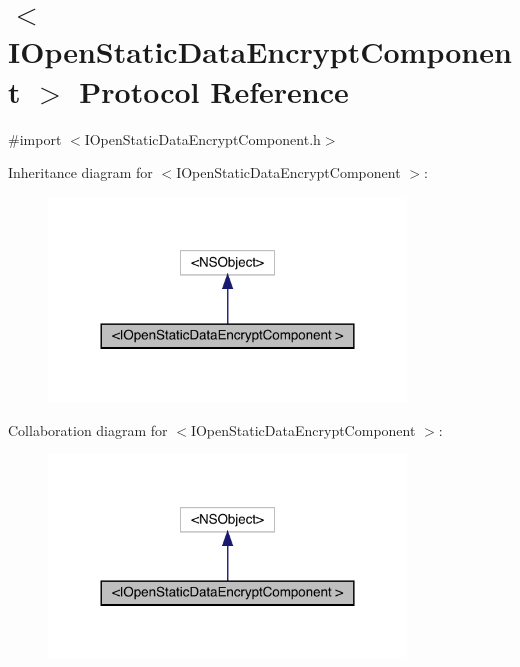 \hypertarget{protocol_i_open_static_data_encrypt_component_01-p}{}\section{$<$I\+Open\+Static\+Data\+Encrypt\+Component $>$ Protocol Reference}
\label{protocol_i_open_static_data_encrypt_component_01-p}


{\ttfamily \#import $<$I\+Open\+Static\+Data\+Encrypt\+Component.\+h$>$}



Inheritance diagram for $<$I\+Open\+Static\+Data\+Encrypt\+Component $>$\+:\nopagebreak
\begin{figure}[H]
\begin{center}
\leavevmode
\includegraphics[width=269pt]{protocol_i_open_static_data_encrypt_component_01-p__inherit__graph}
\end{center}
\end{figure}


Collaboration diagram for $<$I\+Open\+Static\+Data\+Encrypt\+Component $>$\+:\nopagebreak
\begin{figure}[H]
\begin{center}
\leavevmode
\includegraphics[width=269pt]{protocol_i_open_static_data_encrypt_component_01-p__coll__graph}
\end{center}
\end{figure}
